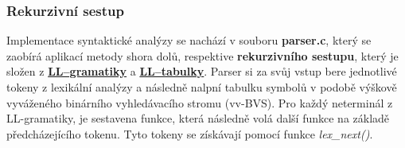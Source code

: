 \documentclass[a4paper, 12pt]{article} %
\begin{document}
            \subsubsection{Rekurzivní sestup}
                Implementace syntaktické analýzy se nachází v souboru \textbf{parser.c}, který se
                zaobírá aplikací metody shora dolů, respektive \textbf{rekurzivního sestupu}, který
                je složen z \hyperref[llgramatika]{\textbf{LL--gramatiky}} a 
                \hyperref[lltabulka]{\textbf{LL--tabulky}}. Parser si za svůj vstup bere jednotlivé 
                tokeny z lexikální analýzy a následně nalpní tabulku symbolů v podobě výškově 
                vyváženého binárního vyhledávacího stromu (vv-BVS). Pro každý neterminál z 
                LL-gramatiky, je sestavena funkce, která následně volá další funkce na základě 
                předcházejícího tokenu. Tyto tokeny se získávají pomocí funkce \textit{lex\_next()}.
\end{document}
